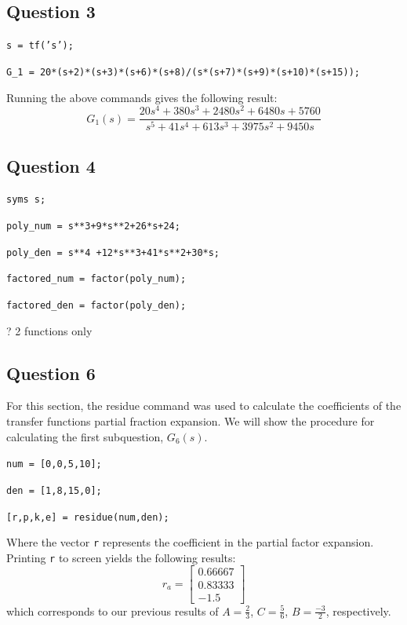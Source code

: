 \documentclass[12pt, a4paper]{article}
\begin{document}

		\subsection*{Question 3} %
		\label{sub:question_3}
			\texttt{s = tf('s');} \par\noindent
			\texttt{G\_1 = 20*(s+2)*(s+3)*(s+6)*(s+8)/(s*(s+7)*(s+9)*(s+10)*(s+15));}

			\noindent Running the above commands gives the following result:
			\[
				G_1(s) = \frac{20 s^4 + 380 s^3 + 2480 s^2 + 6480 s + 5760}{s^5 + 41 s^4 + 613 s^3 + 3975 s^2 + 9450 s}
			\]


		\subsection*{Question 4} %
		\label{sub:question_4}
		\texttt{syms s;}\par\noindent
		\texttt{poly\_num = s**3+9*s**2+26*s+24;}\par\noindent
		\texttt{poly\_den = s**4 +12*s**3+41*s**2+30*s;}\par\noindent
		\texttt{factored\_num = factor(poly\_num);}\par\noindent
		\texttt{factored\_den = factor(poly\_den);}\par\noindent
		? 2 functions only 


		\subsection*{Question 6} %
		\label{sub:question_6}
			For this section, the residue command was used to calculate the coefficients of the transfer functions partial fraction expansion. We will show the procedure for calculating the first subquestion, $G_6(s)$.

			\noindent\texttt{num = [0,0,5,10];}\par\noindent
			\texttt{den = [1,8,15,0];}\par\noindent
			\texttt{[r,p,k,e] = residue(num,den);}

			\noindent Where the vector \texttt{r} represents the coefficient in the partial factor expansion. Printing \texttt{r} to screen yields the following results:
			\[
				r_a =
				\begin{bmatrix}
					0.66667 \\
					0.83333 \\
					-1.5
				\end{bmatrix}
			\]
			which corresponds to our previous results of $A=\tfrac{2}{3}$, $C=\tfrac{5}{6}$, $B=\tfrac{-3}{2}$, respectively.
\end{document}
